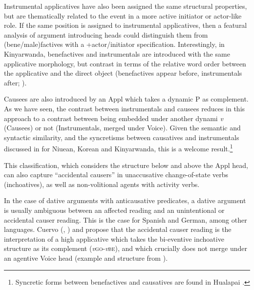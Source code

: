\documentclass[output=paper,colorlinks,citecolor=brown,nonflat]{./langscibook}
\begin{document}
Instrumental applicatives have also been assigned the same structural properties, but are thematically related to the event in a more active initiator or actor-like role. If the same position is assigned to instrumental applicatives, then a featural analysis of argument introducing heads could distinguish them from (bene/male)factives with a +actor/initiator specification. Interestingly, in Kinyarwanda, benefactives and instrumentals are introduced with the same applicative morphology, but contrast in terms of the relative word order between the applicative and the direct object (benefactives appear before, instrumentals after; \citealt{McGinnisGerdts2004}).

Causees are also introduced by an Appl which takes a dynamic \liv P as complement. As we have seen, the contrast between instrumentals and causees reduces in this approach to a contrast between being embedded under another dynami \textit{v} (Causees) or not (Instrumentals, merged under Voice). Given the semantic and syntactic similarity, and the syncretisms between causatives and instrumentals discussed in  for Niuean, Korean and Kinyarwanda, this is a welcome result.\footnote{Syncretic forms between benefactives and causatives are found in Hualapai \citep{Peterson2007}.} 

This classification, which considers the structure below and above the Appl head, can also capture “accidental causers” in unaccusative change-of-state verbs (inchoatives), as well as non-volitional agents with activity verbs.  

In the case of dative arguments with anticausative predicates, a dative argument is usually ambiguous between an affected reading and an unintentional or accidental causer reading. This is the case for Spanish and German, among other languages. Cuervo (\citeyear{Cuervo2003}, \citeyear{Cuervo2014}) and \citet{Schäfer2008} propose that the accidental causer reading is the interpretation of a high applicative which takes the bi-eventive inchoative structure as its complement (\textit{v}\textsc{go}-\textit{v}\textsc{be}), and which crucially does not merge under an agentive Voice head (example and structure from \citealt[166--167]{Cuervo2003}). 
\end{document}
